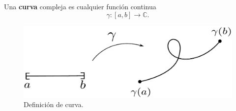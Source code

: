 \begin{defi}
Una \textbf{curva} compleja es cualquier función continua
$$\gamma: [a,b] \longrightarrow \mathbb{C}.$$
\end{defi}

\begin{figure}[H]
    \centering
    \includegraphics[scale = 0.5]{Figuras/Curva1.pdf}
    \caption{Definición de curva.}
    \label{fig:Curva1}
\end{figure}

